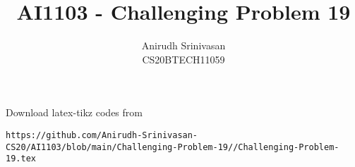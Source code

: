 \documentclass[journal,12pt,twocolumn]{IEEEtran}
\theoremstyle{definition}
\DeclareMathOperator*{\Res}{Res}
\begin{document}
\newcommand{\BEQA}{\begin{eqnarray}}
\newcommand{\EEQA}{\end{eqnarray}}
\newcommand{\define}{\stackrel{\triangle}{=}}

\raggedbottom
\setlength{\parindent}{0pt}
\providecommand{\mbf}{\mathbf}
\providecommand{\pr}[1]{\ensuremath{\Pr\left(#1\right)}}
\providecommand{\qfunc}[1]{\ensuremath{Q\left(#1\right)}}
\providecommand{\sbrak}[1]{\ensuremath{{}\left[#1\right]}}
\providecommand{\lsbrak}[1]{\ensuremath{{}\left[#1\right.}}
\providecommand{\rsbrak}[1]{\ensuremath{{}\left.#1\right]}}
\providecommand{\brak}[1]{\ensuremath{\left(#1\right)}}
\providecommand{\lbrak}[1]{\ensuremath{\left(#1\right.}}
\providecommand{\rbrak}[1]{\ensuremath{\left.#1\right)}}
\providecommand{\cbrak}[1]{\ensuremath{\left\{#1\right\}}}
\providecommand{\lcbrak}[1]{\ensuremath{\left\{#1\right.}}
\providecommand{\rcbrak}[1]{\ensuremath{\left.#1\right\}}}
\theoremstyle{remark}
\newtheorem{rem}{Remark}
\newcommand{\sgn}{\mathop{\mathrm{sgn}}}
\newcommand*{\permcomb}[4][0mu]{{{}^{#3}\mkern#1#2_{#4}}}
\newcommand*{\perm}[1][-3mu]{\permcomb[#1]{P}}
\newcommand*{\comb}[1][-1mu]{\permcomb[#1]{C}}
\providecommand{\abs}[1]{\vert#1\vert}
\providecommand{\res}[1]{\Res\displaylimits_{#1}} 
\providecommand{\norm}[1]{\lVert#1\rVert}
\providecommand{\mtx}[1]{\mathbf{#1}}
\providecommand{\mean}[1]{E[ #1 ]}
\providecommand{\fourier}{\overset{\mathcal{F}}{ \rightleftharpoons}}
\providecommand{\system}{\overset{\mathcal{H}}{ \longleftrightarrow}}
\newcommand{\solution}{\noindent \textbf{Solution: }}
\newcommand{\cosec}{\,\text{cosec}\,}
\providecommand{\dec}[2]{\ensuremath{\overset{#1}{\underset{#2}{\gtrless}}}}
\newcommand{\myvec}[1]{\ensuremath{\begin{pmatrix}#1\end{pmatrix}}}
\newcommand{\mydet}[1]{\ensuremath{\begin{vmatrix}#1\end{vmatrix}}}
\makeatletter
{}
\makeatother
\let\StandardTheFigure\thefigure
\let\vec\mathbf
\renewcommand{\thefigure}{\theproblem}
\def\putbox#1#2#3{\makebox[0in][l]{\makebox[#1][l]{}\raisebox{\baselineskip}[0in][0in]{\raisebox{#2}[0in][0in]{#3}}}}
     \def\rightbox#1{\makebox[0in][r]{#1}}
     \def\centbox#1{\makebox[0in]{#1}}
     \def\topbox#1{\raisebox{-\baselineskip}[0in][0in]{#1}}
     \def\midbox#1{\raisebox{-0.5\baselineskip}[0in][0in]{#1}}
\vspace{3cm}
\title{AI1103 - Challenging Problem 19}
\author{Anirudh Srinivasan\\CS20BTECH11059}
\maketitle
\newpage
\bigskip
\renewcommand{\thefigure}{\theenumi}
\renewcommand{\thetable}{\theenumi}
Download latex-tikz codes from 
%
\begin{lstlisting}
https://github.com/Anirudh-Srinivasan-CS20/AI1103/blob/main/Challenging-Problem-19//Challenging-Problem-19.tex
\end{lstlisting}
\end{document}
